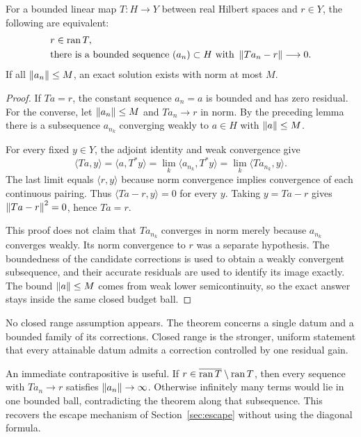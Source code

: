 \begin{theorem}\label{WR01}
For a bounded linear map $T:H\to Y$ between real Hilbert spaces and $r\in Y$, the following are equivalent:
\[
 \begin{split}
 &r\in\operatorname{ran} T,\\
 &\text{there is a bounded sequence }(a_n)\subset H
       \text{ with }\left\lVert Ta_n-r\right\rVert\longrightarrow0.
 \end{split}
\]
If all $\left\lVert a_n\right\rVert\le M$, an exact solution exists with norm at most $M$.
\end{theorem}
\begin{proof}
If $Ta=r$, the constant sequence $a_n=a$ is bounded and has zero residual. For the converse, let $\left\lVert a_n\right\rVert\le M$ and $Ta_n\to r$ in norm. By the preceding lemma there is a subsequence $a_{n_k}$ converging weakly to $a\in H$ with $\left\lVert a\right\rVert\le M$.

For every fixed $y\in Y$, the adjoint identity and weak convergence give
\[
 \langle Ta,y\rangle
 =\langle a,T^*y\rangle
 =\lim_k\langle a_{n_k},T^*y\rangle
 =\lim_k\langle Ta_{n_k},y\rangle.
\]
The last limit equals $\langle r,y\rangle$ because norm convergence implies convergence of each continuous pairing. Thus $\langle Ta-r,y\rangle=0$ for every $y$. Taking $y=Ta-r$ gives $\left\lVert Ta-r\right\rVert^2=0$, hence $Ta=r$.

This proof does not claim that $Ta_{n_k}$ converges in norm merely because $a_{n_k}$ converges weakly. Its norm convergence to $r$ was a separate hypothesis. The boundedness of the candidate corrections is used to obtain a weakly convergent subsequence, and their accurate residuals are used to identify its image exactly. The bound $\left\lVert a\right\rVert\le M$ comes from weak lower semicontinuity, so the exact answer stays inside the same closed budget ball.
\end{proof}

No closed range assumption appears. The theorem concerns a single datum and a bounded family of its corrections. Closed range is the stronger, uniform statement that every attainable datum admits a correction controlled by one residual gain.

An immediate contrapositive is useful. If $r\in\overline{\operatorname{ran} T}\setminus\operatorname{ran} T$, then every sequence with $Ta_n\to r$ satisfies $\left\lVert a_n\right\rVert\to\infty$. Otherwise infinitely many terms would lie in one bounded ball, contradicting the theorem along that subsequence. This recovers the escape mechanism of Section~\ref{sec:escape} without using the diagonal formula.

